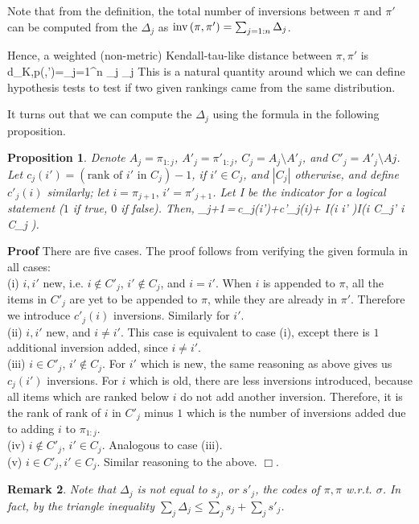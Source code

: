 \documentclass[10pt]{article}
\newtheorem{prop}{Proposition}
\newtheorem{remark}[prop]{Remark}
\newcommand\bl{\left(}
\newcommand\br{\right)}
\begin{document}
Note that from the definition, the total number of inversions between $\pi$ and $\pi'$ can be computed from the $\Delta_j$ as $\inv\bl \pi,\pi'\br=\sum_{j=1:n}\Delta_j$.


Hence, a weighted (non-metric) Kendall-tau-like distance between $\pi,\pi'$ is
\beq
d_{K,p}(\pi,\pi')=\sum_{j=1}^{n} \theta_j \Delta_j
\eeq
This is a natural quantity around which we can define hypothesis tests to test if two given rankings came from the same distribution.

It turns out that we can compute the $\Delta_j$ using the formula in the following proposition.

%
\begin{prop} Denote $A_j = \pi_{1:j}$, $A'_j = \pi'_{1:j}$, $C_j=A_j\setminus A'_j$, and $C'_j=A'_j\setminus Aj$. Let $c_j(i')=\bl \text{rank of $i'$ in $C_j$}\br -1$, if $i'\in C_j$, and $|C_j|$ otherwise, and define $c'_j(i)$ similarly; let $i=\pi_{j+1},\,i'=\pi'_{j+1}$. Let I be the indicator for a logical statement ($1$ if true, $0$ if false). Then,
  \beq \Delta_{j+1}\,=\,c_j(i')+c'_j(i)+ I\bl i \neq i' \br I\bl i \notin C_j'  i \notin C_j \br.  \eeq
\end{prop}
%
    {\bf Proof} There are five cases. The proof follows from verifying the given formula in all cases:\\
    (i) $i,i'$ new, i.e. $i\not\in C'_j$, $i'\not\in C_j$, and $i=i'$. When $i$ is appended to $\pi$, all the items in $C'_j$ are yet to be appended to $\pi$, while they are already in $\pi'$. Therefore we introduce $c'_j(i)$ inversions. Similarly for $i'$.\\
    (ii) $i,i'$ new, and $i\neq i'$. This case is equivalent to case (i), except there is $1$ additional inversion added, since $i \neq i'$.\\
    (iii) $i\in C'_j,\,i'\not\in C_j$. For $i'$ which is new, the same reasoning as above gives us $c_j(i')$ inversions. For $i$ which is old, there are less inversions introduced, because all items which are ranked below $i$ do not add another inversion. Therefore, it is the rank of rank of $i$ in $C'_j$ minus $1$ which is the number of inversions added due to adding $i$ to $\pi_{1:j}$.\\
    (iv) $i\notin C'_j,\,i'\in C_j$.
    Analogous to case (iii).\\
    (v) $i\in C'_j,i'\in C_j$. Similar reasoning to the above. $\Box$.
\begin{remark} 
Note that $\Delta_j$ is not equal to $s_j$, or $s'_j$, the codes of $\pi,\pi$ w.r.t. $\sigma$. In fact, by the triangle inequality $\sum_j\Delta_j\leq \sum_j s_j +\sum_j s'_j$.  
\end{remark}
\end{document}
